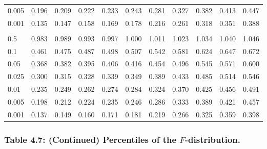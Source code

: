 \documentclass[
]{article}
\begin{document}
\begin{longtable}[t]{lrrrrrrrrrr}
\hspace{1em}0.005 & 0.196 & 0.209 & 0.222 & 0.233 & 0.243 & 0.281 & 0.327 & 0.382 & 0.413 & 0.447\\
\hspace{1em}0.001 & 0.135 & 0.147 & 0.158 & 0.169 & 0.178 & 0.216 & 0.261 & 0.318 & 0.351 & 0.388\\
\addlinespace[0.3em]
\multicolumn{11}{l}{\textbf{$k_2=15$}}\\
\hspace{1em}0.5 & 0.983 & 0.989 & 0.993 & 0.997 & 1.000 & 1.011 & 1.023 & 1.034 & 1.040 & 1.046\\
\hspace{1em}0.1 & 0.461 & 0.475 & 0.487 & 0.498 & 0.507 & 0.542 & 0.581 & 0.624 & 0.647 & 0.672\\
\hspace{1em}0.05 & 0.368 & 0.382 & 0.395 & 0.406 & 0.416 & 0.454 & 0.496 & 0.545 & 0.571 & 0.600\\
\hspace{1em}0.025 & 0.300 & 0.315 & 0.328 & 0.339 & 0.349 & 0.389 & 0.433 & 0.485 & 0.514 & 0.546\\
\hspace{1em}0.01 & 0.235 & 0.249 & 0.262 & 0.274 & 0.284 & 0.324 & 0.370 & 0.425 & 0.456 & 0.491\\
\hspace{1em}0.005 & 0.198 & 0.212 & 0.224 & 0.235 & 0.246 & 0.286 & 0.333 & 0.389 & 0.421 & 0.457\\
\hspace{1em}0.001 & 0.137 & 0.149 & 0.160 & 0.171 & 0.181 & 0.219 & 0.266 & 0.325 & 0.359 & 0.398\\
\bottomrule
\end{longtable}

\newpage

\subsubsection{\texorpdfstring{Table 4.7: (Continued) Percentiles of the
\(F\)-distribution.}{Table 4.7: (Continued) Percentiles of the F-distribution.}}\label{table-4.7-continued-percentiles-of-the-f-distribution.}
\end{document}
